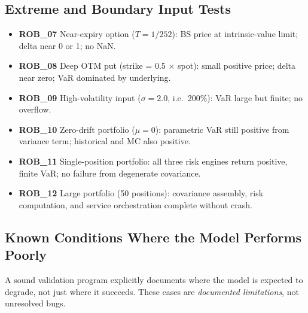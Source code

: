 \documentclass[11pt]{article}
\begin{document}
\subsection{Extreme and Boundary Input Tests}

\begin{itemize}
  \item \textbf{ROB\_07} Near-expiry option ($T = 1/252$): BS price at
    intrinsic-value limit; delta near 0 or 1; no NaN.
  \item \textbf{ROB\_08} Deep OTM put (strike = 0.5 $\times$ spot): small
    positive price; delta near zero; VaR dominated by underlying.
  \item \textbf{ROB\_09} High-volatility input ($\sigma = 2.0$, i.e.\ 200\%):
    VaR large but finite; no overflow.
  \item \textbf{ROB\_10} Zero-drift portfolio ($\mu = 0$): parametric VaR
    still positive from variance term; historical and MC also positive.
  \item \textbf{ROB\_11} Single-position portfolio: all three risk engines
    return positive, finite VaR; no failure from degenerate covariance.
  \item \textbf{ROB\_12} Large portfolio (50 positions): covariance assembly,
    risk computation, and service orchestration complete without crash.
\end{itemize}

\subsection{Known Conditions Where the Model Performs Poorly}

A sound validation program explicitly documents where the model is
expected to degrade, not just where it succeeds.  These cases are
\emph{documented limitations}, not unresolved bugs.
\end{document}
